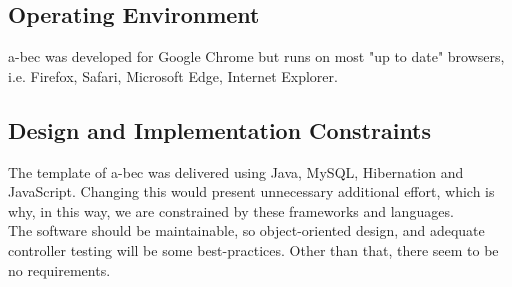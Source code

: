 \subsection{Operating Environment}
	a-bec was developed for Google Chrome but runs on most "up to date" browsers, i.e. Firefox, Safari, Microsoft Edge, Internet Explorer.
	
\subsection{Design and Implementation Constraints}
	The template of a-bec was delivered using Java, MySQL, Hibernation and JavaScript. Changing this would 
	present unnecessary additional effort, which is why, in this way, we are constrained by these frameworks and languages.\\
	The software should be maintainable, so object-oriented design, and adequate controller testing will be some best-practices.
	Other than that, there seem to be no requirements.
